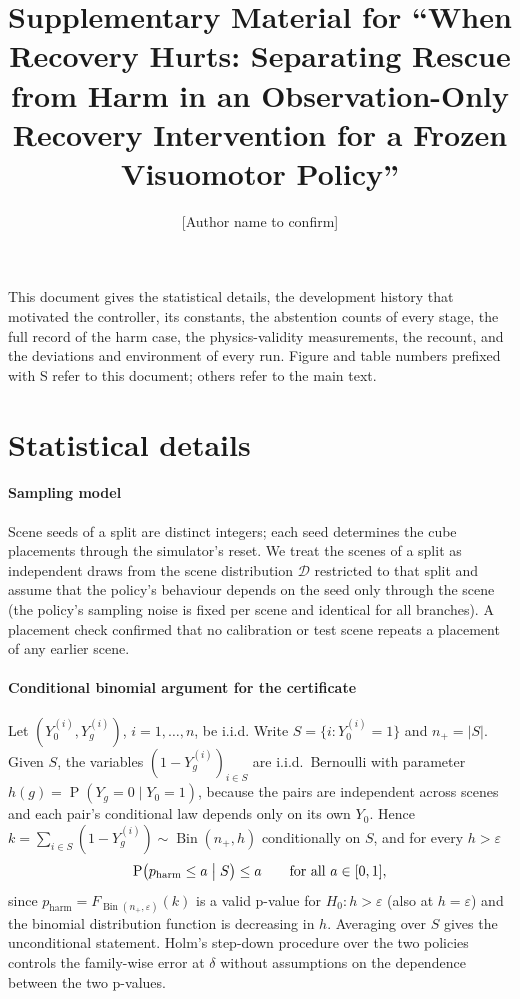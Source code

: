 \documentclass[preprint,12pt]{elsarticle}
\renewcommand{\Pr}{\operatorname{P}}
\newcommand{\Bin}{\operatorname{Bin}}
\begin{document}
\begin{frontmatter}
\title{Supplementary Material for ``When Recovery Hurts: Separating Rescue from Harm in an Observation-Only Recovery Intervention for a Frozen Visuomotor Policy''}
\author{[Author name to confirm]}
\end{frontmatter}

This document gives the statistical details, the development history that motivated the controller, its constants, the abstention counts of every stage, the full record of the harm case, the physics-validity measurements, the recount, and the deviations and environment of every run. Figure and table numbers prefixed with S refer to this document; others refer to the main text.

\section{Statistical details}\label{sec:s-stats}

\paragraph{Sampling model} Scene seeds of a split are distinct integers; each seed determines the cube placements through the simulator's reset. We treat the scenes of a split as independent draws from the scene distribution $\mathcal{D}$ restricted to that split and assume that the policy's behaviour depends on the seed only through the scene (the policy's sampling noise is fixed per scene and identical for all branches). A placement check confirmed that no calibration or test scene repeats a placement of any earlier scene.

\paragraph{Conditional binomial argument for the certificate} Let $(Y_0^{(i)},Y_g^{(i)})$, $i=1,\dots,n$, be i.i.d. Write $S=\{i: Y_0^{(i)}=1\}$ and $n_+=|S|$. Given $S$, the variables $(1-Y_g^{(i)})_{i\in S}$ are i.i.d.\ Bernoulli with parameter $h(g)=\Pr(Y_g=0\mid Y_0=1)$, because the pairs are independent across scenes and each pair's conditional law depends only on its own $Y_0$. Hence $k=\sum_{i\in S}(1-Y_g^{(i)})\sim\Bin(n_+,h)$ conditionally on $S$, and for every $h>\varepsilon$
\begin{equation}
\Pr\bigl(p_{\mathrm{harm}}\le a \bigm| S\bigr)\le a\qquad\text{for all } a\in[0,1],
\end{equation}
since $p_{\mathrm{harm}}=F_{\Bin(n_+,\varepsilon)}(k)$ is a valid p-value for $H_0: h>\varepsilon$ (also at $h=\varepsilon$) and the binomial distribution function is decreasing in $h$. Averaging over $S$ gives the unconditional statement. Holm's step-down procedure over the two policies controls the family-wise error at $\delta$ without assumptions on the dependence between the two p-values.
\end{document}
